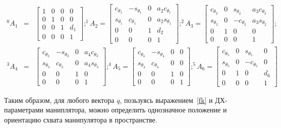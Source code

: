 \begin{align*}
	^0A_1 &=& 
	\left[\begin{matrix}1 & 0 & 0 & 0\\0 & 1 & 0 & 0\\0 & 0 & 1 & d_{1}\\0 & 0 & 0 & 1\end{matrix}\right]; 
	^1A_2 =
	\left[\begin{matrix}c_{\theta_1} & - s_{\theta_1} & 0 & a_{2} c_{\theta_1}\\s_{\theta_1} & c_{\theta_1} & 0 & a_{2} s_{\theta_1}\\0 & 0 & 1 & d_{2}\\0 & 0 & 0 & 1\end{matrix}\right]; 
	^2A_3 =
	\left[\begin{matrix}c_{\theta_2} & 0 & s_{\theta_2} & a_{3} c_{\theta_2}\\s_{\theta_2} & 0 & - c_{\theta_2} & a_{3} s_{\theta_2}\\0 & 1 & 0 & 0\\0 & 0 & 0 & 1\end{matrix}\right];
	\\
	^3A_4 &=& 
	\left[\begin{matrix}c_{\theta_3} & - s_{\theta_3} & 0 & a_{4} c_{\theta_3}\\s_{\theta_3} & c_{\theta_3} & 0 & a_{4} s_{\theta_3}\\0 & 0 & 1 & 0\\0 & 0 & 0 & 1\end{matrix}\right];
	^4A_5 =
	\left[\begin{matrix}c_{\theta_4} & - s_{\theta_4} & 0 & 0\\s_{\theta_4} & c_{\theta_4} & 0 & 0\\0 & 0 & 1 & 0\\0 & 0 & 0 & 1\end{matrix}\right];
	^5A_6 =
	 \left[\begin{matrix}c_{\theta_5} & 0 & s_{\theta_5} & 0\\s_{\theta_5} & 0 & - c_{\theta_5} & 0\\0 & 1 & 0 & d_{6}\\0 & 0 & 0 & 1\end{matrix}\right]
\end{align*}

Таким образом, для любого вектора $q$, позьзуясь выражением~\eqref{fk} и ДХ-параметрами маниплятора, можно определить однозначное положение и ориентацию схвата манипулятора в пространстве.

